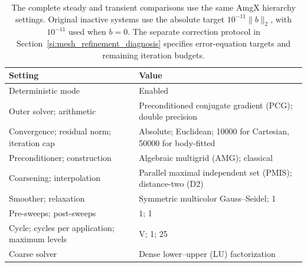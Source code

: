 \begin{table}[pos=htbp]
\centering\small
\caption{The complete steady and transient comparisons use the
same AmgX hierarchy settings. Original inactive systems use the absolute
target $10^{-11}\|b\|_2$, with $10^{-11}$ used when $b=0$.
The separate correction protocol in Section~\ref{si:mesh_refinement_diagnosis}
specifies error-equation targets and remaining iteration budgets.}
\label{si:tab_amgx_configuration}
\begin{tabularx}{\textwidth}{@{}lX@{}}
\toprule
Setting & Value \\
\midrule
Deterministic mode & Enabled \\
Outer solver; arithmetic & Preconditioned conjugate gradient (PCG); double precision \\
Convergence; residual norm; iteration cap &
Absolute; Euclidean; 10000 for Cartesian, 50000 for body-fitted \\
Preconditioner; construction & Algebraic multigrid (AMG); classical \\
Coarsening; interpolation & Parallel maximal independent set (PMIS); distance-two (D2) \\
Smoother; relaxation & Symmetric multicolor Gauss--Seidel; 1 \\
Pre-sweeps; post-sweeps & 1; 1 \\
Cycle; cycles per application; maximum levels & V; 1; 25 \\
Coarse solver & Dense lower--upper (LU) factorization \\
\bottomrule
\end{tabularx}
\end{table}